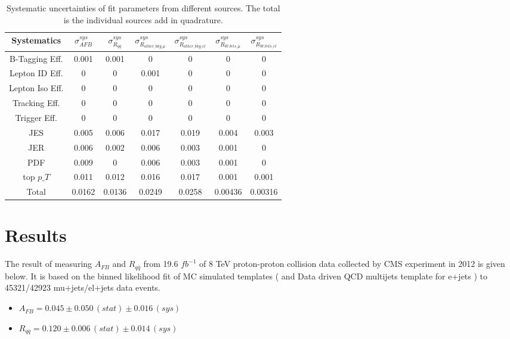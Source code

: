 \begin{table}[htb]
\centering
\begin{tabular}{c|cc|cccc}
Systematics &    $\sigma_{AFB}^{sys}$ & $\sigma_{R_{q\bar{q}}}^{sys}$ & $\sigma_{R_{other\_bkg\_\mu}}^{sys}$ & $\sigma_{R_{other\_bkg\_el}}^{sys}$ & $\sigma_{R_{WJets\_\mu}}^{sys}$ & $\sigma_{R_{WJets\_el}}^{sys}$  \\
\hline
B-Tagging Eff.  &   0.001 &    0.001 &                  0 &                  0 &              0 &              0 \\
Lepton ID Eff.  &       0 &        0 &              0.001 &                  0 &              0 &              0 \\
Lepton Iso Eff. &       0 &        0 &                  0 &                  0 &              0 &              0 \\
Tracking Eff.   &       0 &        0 &                  0 &                  0 &              0 &              0 \\
Trigger Eff.    &       0 &        0 &                  0 &                  0 &              0 &              0 \\
JES             &   0.005 &    0.006 &              0.017 &              0.019 &          0.004 &          0.003 \\
JER             &   0.006 &    0.002 &              0.006 &              0.003 &          0.001 &              0 \\
PDF             &   0.009 &        0 &              0.006 &              0.003 &          0.001 &              0 \\
top $p\_T$      &   0.011 &    0.012 &              0.016 &              0.017 &          0.001 &          0.001 \\
\hline
Total           &  0.0162 &   0.0136 &             0.0249 &             0.0258 &        0.00436 &        0.00316 \\
\hline
\end{tabular}
\caption{Systematic uncertainties of fit parameters from different sources. The total is the individual sources add in quadrature. }
\label{tab:sys-err}
\end{table}


\clearpage
\section{Results}
\label{sec:results}

The result of measuring $A_{FB}$ and $R_{q\bar{q}}$ from 19.6 $fb^{-1}$ of 8 TeV proton-proton collision data collected by CMS experiment in 2012 is given below. It is based on the binned likelihood fit of MC simulated templates ( and Data driven QCD multijets template for e+jets ) to 45321/42923 mu+jets/el+jets data events. 
\begin{itemize}
\item $ A_{FB} = 0.045  \pm 0.050 \, (stat) \pm 0.016 \, (sys)$

\item $ R_{q\bar{q}} = 0.120  \pm 0.006 \, (stat) \pm 0.014 \, (sys) $
\end{itemize}



